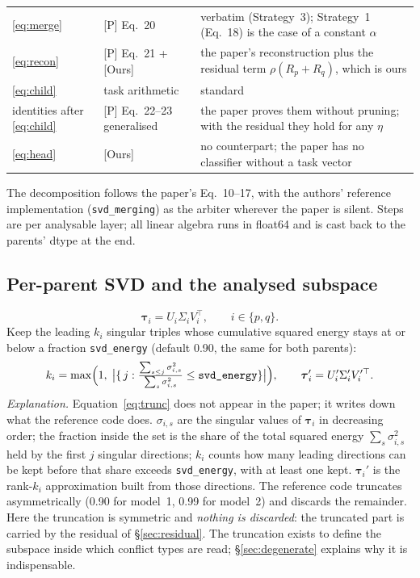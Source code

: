 \documentclass[11pt,a4paper]{article}
\newcommand{\tauv}{\boldsymbol{\tau}}
\newcommand{\code}[1]{\texttt{#1}}
\begin{document}
\begin{table}[h]
\begin{tabular}{llp{8.6cm}}
\ref{eq:merge} & [P] Eq.~20 & verbatim (Strategy~3); Strategy~1 (Eq.~18) is the case of a constant $\alpha$ \\
\ref{eq:recon} & [P] Eq.~21 + [Ours] & the paper's reconstruction plus the residual term $\rho(R_p+R_q)$, which is ours \\
\ref{eq:child} & task arithmetic & standard \\
identities after \ref{eq:child} & [P] Eq.~22--23 generalised & the paper proves them without pruning; with the residual they hold for any $\eta$ \\
\ref{eq:head} & [Ours] & no counterpart; the paper has no classifier without a task vector \\
\bottomrule
\end{tabular}
\end{table}

The decomposition follows the paper's Eq.~10--17, with the authors' reference implementation (\code{svd\_merging}) as the arbiter wherever the paper is silent. Steps are per analysable layer; all linear algebra runs in float64 and is cast back to the parents' dtype at the end.

\subsection{Per-parent SVD and the analysed subspace}
\begin{equation}
\tauv_i = U_i \Sigma_i V_i^{\top}, \qquad i\in\{p,q\}.
\end{equation}
Keep the leading $k_i$ singular triples whose cumulative squared energy stays at or below a fraction \code{svd\_energy} (default 0.90, the same for both parents):
\begin{equation}
k_i = \max\Bigl(1,\; \bigl|\{\,j : \tfrac{\sum_{s\le j}\sigma_{i,s}^2}{\sum_s \sigma_{i,s}^2} \le \code{svd\_energy}\}\bigr|\Bigr),
\qquad
\tauv_i' = U_i' \Sigma_i' V_i'^{\top}.
\label{eq:trunc}
\end{equation}
\emph{Explanation.} Equation~\ref{eq:trunc} does not appear in the paper; it writes down what the reference code does. $\sigma_{i,s}$ are the singular values of $\tauv_i$ in decreasing order; the fraction inside the set is the share of the total squared energy $\sum_s\sigma_{i,s}^2$ held by the first $j$ singular directions; $k_i$ counts how many leading directions can be kept before that share exceeds \code{svd\_energy}, with at least one kept. $\tauv_i'$ is the rank-$k_i$ approximation built from those directions. The reference code truncates asymmetrically (0.90 for model~1, 0.99 for model~2) and discards the remainder. Here the truncation is symmetric and \emph{nothing is discarded}: the truncated part is carried by the residual of \S\ref{sec:residual}. The truncation exists to define the subspace inside which conflict types are read; \S\ref{sec:degenerate} explains why it is indispensable.
\end{document}
